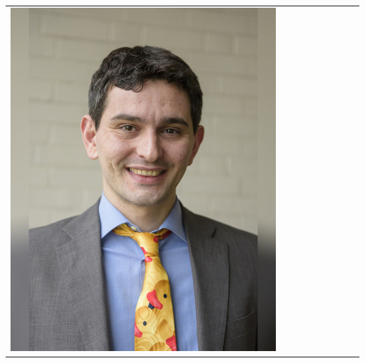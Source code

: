 \documentclass[landscape,a0paper,fontscale=0.292]{baposter}
\begin{document}
\begin{poster}
{\begin{center}
\begin{tabularx}{\linewidth}{X X X X X X X X X}
{\centering \includegraphics[width=0.65\linewidth]{tani.jpg}}\\ 


\end{tabularx}
\end{center}}
\end{poster}
\end{document}
